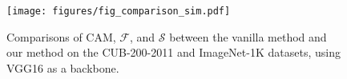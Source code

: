 \begin{figure}[t]
	\centering
    \texttt{[image: figures/fig\_comparison\_sim.pdf]}
    \vspace{-0.6em}
    \caption{Comparisons of CAM, $\mathcal{F}$, and $\mathcal{S}$ between the vanilla method and our method on the CUB-200-2011 and ImageNet-1K datasets, using VGG16 as a backbone.}
    \label{fig:compare_sim}
\end{figure}